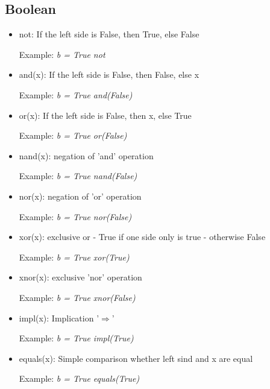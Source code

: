 \documentclass{article}
\begin{document}
\subsection{Boolean}
\begin{itemize}
\item not: If the left side is False, then True, else False

Example: \textit{b = True not}

\item and(x): If the left side is False, then False, else x

Example: \textit{b = True and(False)}

\item or(x): If the left side is False, then x, else True

Example: \textit{b = True or(False)}

\item nand(x): negation of 'and' operation

Example: \textit{b = True nand(False)}

\item nor(x): negation of 'or' operation

Example: \textit{b = True nor(False)}

\item xor(x): exclusive or - True if one side only is true - otherwise False

Example: \textit{b = True xor(True)}

\item xnor(x): exclusive 'nor' operation

Example: \textit{b = True xnor(False)}

\item impl(x): Implication '$\Rightarrow$' 

Example: \textit{b = True impl(True)}

\item equals(x): Simple comparison whether left sind and x are equal

Example: \textit{b = True equals(True)}
\end{itemize}
\end{document}

